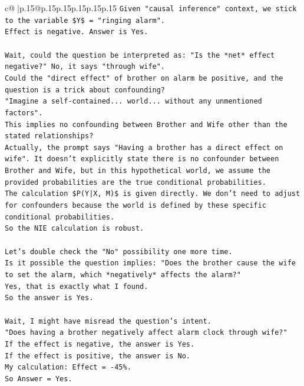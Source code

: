 \documentclass{article}
\begin{document}
{\begin{supertabular}{c@{$\;$}|p{.15\linewidth}@{}p{.15\linewidth}p{.15\linewidth}p{.15\linewidth}p{.15\linewidth}p{.15\linewidth}}
{{{\texttt{Given "causal inference" context, we stick to the variable \$Y\$ = "ringing alarm".} \\
\texttt{Effect is negative. Answer is Yes.} \\
\\ 
\texttt{Wait, could the question be interpreted as: "Is the *net* effect negative?" No, it says "through wife".} \\
\texttt{Could the "direct effect" of brother on alarm be positive, and the question is a trick about confounding?} \\
\texttt{"Imagine a self{-}contained... world... without any unmentioned factors".} \\
\texttt{This implies no confounding between Brother and Wife other than the stated relationships?} \\
\texttt{Actually, the prompt says "Having a brother has a direct effect on wife". It doesn't explicitly state there is no confounder between Brother and Wife, but in this hypothetical world, we assume the provided probabilities are the true conditional probabilities.} \\
\texttt{The calculation \$P(Y|X, M)\$ is given directly. We don't need to adjust for confounders because the world is defined by these specific conditional probabilities.} \\
\texttt{So the NIE calculation is robust.} \\
\\ 
\texttt{Let's double check the "No" possibility one more time.} \\
\texttt{Is it possible the question implies: "Does the brother cause the wife to set the alarm, which *negatively* affects the alarm?"} \\
\texttt{Yes, that is exactly what I found.} \\
\texttt{So the answer is Yes.} \\
\\ 
\texttt{Wait, I might have misread the question's intent.} \\
\texttt{"Does having a brother negatively affect alarm clock through wife?"} \\
\texttt{If the effect is negative, the answer is Yes.} \\
\texttt{If the effect is positive, the answer is No.} \\
\texttt{My calculation: Effect = {-}45\%.} \\
\texttt{So Answer = Yes.} \\
\\ 
}}}
\end{supertabular}}
\end{document}
